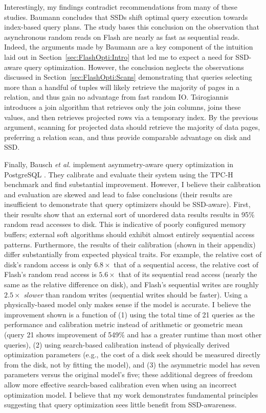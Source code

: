 Interestingly, my findings contradict recommendations from many of these studies.
Baumann concludes that SSDs shift optimal query execution towards index-based query plans.
The study bases this conclusion on the observation that asynchronous random reads on Flash are nearly as fast as sequential reads.
Indeed, the arguments made by Baumann are a key component of the intuition laid out in Section~\ref{sec:FlashOpti:Intro} that led me to expect a need for SSD-aware query optimization.
However, the conclusion neglects the observations discussed in Section~\ref{sec:FlashOpti:Scans} demonstrating that queries selecting more than a handful of tuples will likely retrieve the majority of pages in a relation, and thus gain no advantage from fast random IO.
Tsirogiannis introduces a join algorithm that retrieves only the join columns, joins these values, and then retrieves projected rows via a temporary index.
By the previous argument, scanning for projected data should retrieve the majority of data pages, preferring a relation scan, and thus provide comparable advantage on disk and SSD.

Finally, Bausch \emph{et al.} implement asymmetry-aware query optimization in PostgreSQL \cite{BauschPetrov12}.
They calibrate and evaluate their system using the TPC-H benchmark and find substantial improvement.
However, I believe their calibration and evaluation are skewed and lead to false conclusions (their results are insufficient to demonstrate that query optimizers should be SSD-aware).
First, their results show that an external sort of unordered data results results in 95\% random read accesses to disk.
This is indicative of poorly configured memory buffers; external soft algorithms should exhibit almost entirely sequential access patterns.
Furthermore, the results of their calibration (shown in their appendix) differ substantially from expected physical traits.
For example, the relative cost of disk's random access is only $6.8\times$ that of a sequential access, the relative cost of Flash's random read access is $5.6\times$ that of its sequential read access (nearly the same as the relative difference on disk), and Flash's sequential writes are roughly $2.5\times$ \emph{slower} than random writes (sequential writes should be faster).
Using a physically-based model only makes sense if the model is accurate.
I believe the improvement shown is a function of (1) using the total time of 21 queries as the performance and calibration metric instead of arithmetic or geometric mean (query 21 shows improvement of 549\% and has a greater runtime than most other queries), (2) using search-based calibration instead of physically derived optimization parameters (e.g., the cost of a disk seek should be measured directly from the disk, not by fitting the model), and (3) the asymmetric model has seven parameters versus the original model's five; these additional degrees of freedom allow more effective search-based calibration even when using an incorrect optimization model.
I believe that my work demonstrates fundamental principles suggesting that query optimization sees little benefit from SSD-awareness.

